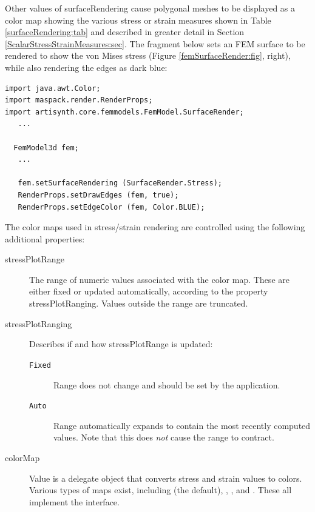 %
Other values of {\sf surfaceRendering} cause polygonal meshes to be
displayed as a color map showing the various stress or strain measures
shown in Table \ref{surfaceRendering:tab} and described in greater
detail in Section \ref{ScalarStressStrainMeasures:sec}.  The fragment
below sets an FEM surface to be rendered to show the von Mises stress
(Figure \ref{femSurfaceRender:fig}, right), while also rendering the
edges as dark blue:
%
\begin{lstlisting}[]
import java.awt.Color;
import maspack.render.RenderProps;
import artisynth.core.femmodels.FemModel.SurfaceRender;
   ...

  FemModel3d fem;
   ...

   fem.setSurfaceRendering (SurfaceRender.Stress);
   RenderProps.setDrawEdges (fem, true);
   RenderProps.setEdgeColor (fem, Color.BLUE);
\end{lstlisting}
%
The color maps used in stress/strain rendering are controlled using
the following additional properties:

\begin{description}

\item[stressPlotRange]\mbox{}

The range of numeric values associated with the color map. These are
either fixed or updated automatically, according to the property {\sf
stressPlotRanging}.  Values outside the range are truncated.

\item[stressPlotRanging]\mbox{}

Describes if and how {\sf stressPlotRange} is updated:

\begin{description}

\item[{\tt Fixed}]\mbox{}

Range does not change and should be set by the application.

\item[{\tt Auto}]\mbox{}

Range automatically expands to contain the most recently computed
values. Note that this does {\it not} cause the range to contract.

\end{description}

\item[colorMap]\mbox{}

Value is a delegate object that converts stress and strain values to
colors. Various types of maps exist, including
 (the default),
,
, and
.  These all implement the
 interface.

\end{description}

